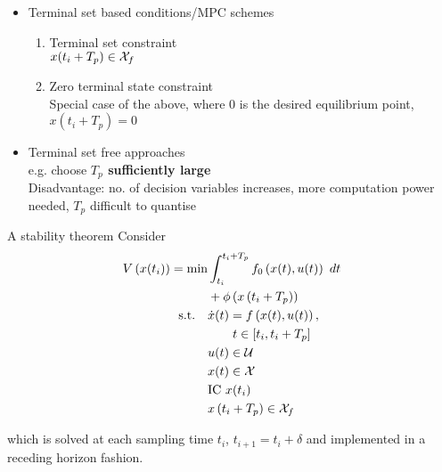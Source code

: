 \begin{itemize}
    \item Terminal set based conditions/MPC schemes
            \begin{enumerate}
                \item Terminal set constraint\\
                        $x(t_i + T_p) \in \setX{f}$
                        \begin{figure}[H]
                            \centering
                            \def\svgwidth{0.5\columnwidth}
                            { \footnotesize
                            
                            }
                        \end{figure}
                \item Zero terminal state constraint\\
                        Special case of the above, where 0 is the desired equilibrium point, $x(t_i+T_p) = 0$
                        \begin{figure}[H]
                            \centering
                            \def\svgwidth{0.5\columnwidth}
                            { \footnotesize
                            
                            }
                        \end{figure}
            \end{enumerate}
    \item Terminal set free approaches\\
            e.g. choose \textbf{$T_p$ sufficiently large}\\
            Disadvantage: no. of decision variables increases, more computation power needed, $T_p$ difficult to quantise
\end{itemize}

\begin{theorem}{A stability theorem}{}
    Consider 
    \begin{align*}
        V \paren{  x(t_i) }
        = \min  & \intdt{t_i}{t_i+T_p}{ f_0 \paren{x(t), u(t)} } \\
                    &+ \phi \paren{ x\paren{ t_i + T_p } }\\
        \st \quad   & \dot{x}(t) = f \paren{ x(t), u(t) }, \\
                    &\qquad t \in [ t_i, t_i + T_p ]\\
                    & u(t) \in \setU{}\\
                    & x(t) \in \setX{}\\
                    & \txt{IC } x(t_i)\\
                    & x\paren{ t_i + T_p } \in \setX{f}
    \end{align*}
    
    which is solved at each sampling time $t_i$, $t_{i+1} = t_i + \delta$
    and implemented in a receding horizon fashion.\\
     
\end{theorem}

